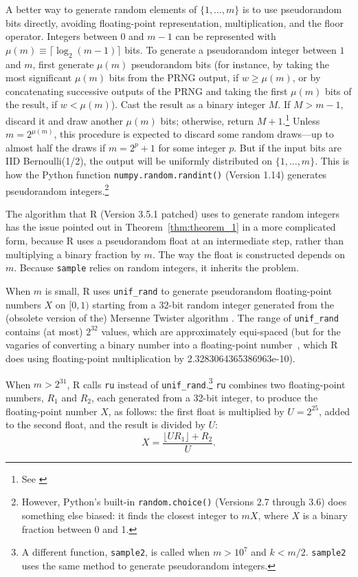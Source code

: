 \documentclass[12pt]{article}
\begin{document}
A better way to generate random elements of $\{1, \dots, m\}$ is to use pseudorandom bits directly,
avoiding floating-point representation, multiplication, and the floor operator. 
Integers between $0$ and $m-1$ can be represented with $\mu(m) \equiv \lceil \log_2(m-1) \rceil$ bits. 
To generate a pseudorandom integer between $1$ and $m$, first generate 
$\mu(m)$ pseudorandom bits (for instance, by taking the most significant $\mu(m)$ bits from the PRNG output, if $w \ge \mu(m)$, or by concatenating successive outputs of the PRNG and taking the
first $\mu(m)$ bits of the result, if $w < \mu(m)$).
Cast the result as a binary integer $M$.  
If $M > m-1$, discard it and draw another $\mu(m)$ bits; otherwise, return $M+1$.\footnote{%
   See \citet[p.114]{knuth_art_1997}
}
Unless $m = 2^{\mu(m)}$, this procedure is expected to discard some random draws---up to almost 
half the draws if $m = 2^p+1$ for some integer $p$.
But if the input bits are IID Bernoulli(1/2), the output will be uniformly distributed on $\{1, \ldots, m\}$.
This is how the Python function \texttt{numpy.random.randint()} (Version 1.14) generates pseudorandom integers.\footnote{%
  However, Python's built-in \texttt{random.choice()} (Versions 2.7 through 3.6) does 
  something else biased: it finds the closest integer to $mX$, where $X$ is a binary fraction 
  between 0 and 1.
}

The algorithm that R (Version 3.5.1 patched) \citep{R_2018} uses to generate random integers
has the issue pointed out in Theorem~\ref{thm:theorem_1} in a more complicated form, 
because R uses a pseudorandom float at an intermediate step, rather than multiplying a binary fraction
by $m$.
The way the float is constructed depends on $m$.
Because \texttt{sample} relies on random integers, it inherits the problem.

When $m$ is small, R uses \texttt{unif\_rand} to generate pseudorandom floating-point 
numbers $X$ on $[0, 1)$ starting from a $32$-bit random integer generated from the
(obsolete version of the) Mersenne Twister algorithm \citep{mt1998}.
The range of \texttt{unif\_rand} contains 
(at most) $2^{32}$ values, which are approximately equi-spaced (but for the vagaries of converting
a binary number into a floating-point number~\citep{goldberg91}, which
R does using floating-point multiplication by 2.3283064365386963e-10).

When $m > 2^{31}$, R calls \texttt{ru} instead of \texttt{unif\_rand}.\footnote{
   A different function, \texttt{sample2}, is called when $m > 10^7$ and $k < m/2$.
\texttt{sample2} uses the same method to generate pseudorandom integers.
}
\texttt{ru} combines two floating-point numbers, $R_1$ and $R_2$, each generated from a 32-bit integer, 
to produce the floating-point number $X$, as follows:
the first float is multiplied by $U = 2^{25}$, added to the second float, and the result is divided by
$U$:
$$ X = \frac{\lfloor U R_1 \rfloor + R_2}{U}.$$
\end{document}
